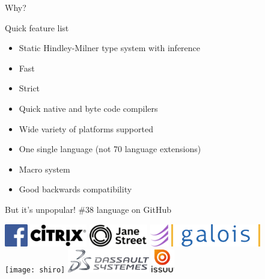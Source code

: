 \documentclass{beamer}
\begin{document}
\begin{frame}{}
  \center
  \fontsize{70}{70} \exclaim Why?
\end{frame}

\begin{frame}{Quick feature list}
  \begin{itemize}
    \item Static Hindley-Milner type system with inference
    \item Fast
    \item Strict
    \item Quick native and byte code compilers
    \item Wide variety of platforms supported
    \item One single language (not 70 language extensions)
    \item Macro system
    \item Good backwards compatibility
  \end{itemize}
\end{frame}

\begin{frame}{But it's unpopular!}
  \#38 language on GitHub

  \includegraphics[height=1cm]{facebook}
  \includegraphics[height=1cm]{citrix}
  \includegraphics[height=1cm]{janestreet}
  \includegraphics[height=1cm]{esper}
  \includegraphics[height=1cm]{galois}\\
  \texttt{[image: shiro]}
  \includegraphics[height=1cm]{ds}
  \includegraphics[height=1cm]{issuu}
\end{frame}
\end{document}
